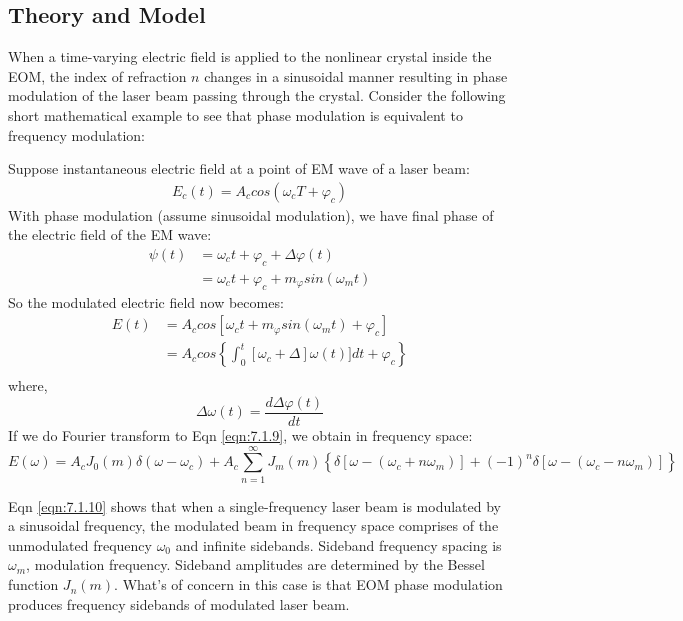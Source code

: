 \documentclass[12pt]{report}
\begin{document}
\subsection{Theory and Model}
When a time-varying electric field is applied to the nonlinear crystal inside the EOM, the index of refraction $n$ changes in a sinusoidal manner resulting in phase modulation of the laser beam passing through the crystal. Consider the following short mathematical example to see that phase modulation is equivalent to frequency modulation: 
\par
Suppose instantaneous electric field at a point of EM wave of a laser beam: 
\begin{align*}
    E_c(t) = A_c cos(\omega_c T + \varphi_c)
\end{align*}
With phase modulation (assume sinusoidal modulation), we have final phase of the electric field of the EM wave: 
\begin{align*}
    \psi(t) &= \omega_c t + \varphi_c + \Delta \varphi (t) \\
            &= \omega_c t + \varphi_c + m_{\varphi} sin(\omega_m t)
\end{align*}
So the modulated electric field now becomes: 
\begin{align}
    E(t) &= A_c cos[ \omega_c t + m_{\varphi} sin(\omega_m t) + \varphi_c] \label{eqn:7.1.9}\\
         &= A_c cos\left\{  \int_0^t [ \omega_c + \Delta ]\omega(t)] dt + \varphi_c \right\} \\
\end{align}
where, 
\begin{equation*}
    \Delta \omega (t) = \frac{d\Delta \varphi (t)}{dt}
\end{equation*}
If we do Fourier transform to Eqn \ref{eqn:7.1.9}, we obtain in frequency space: 
\begin{equation}
    E(\omega) = A_c J_0(m) \delta(\omega - \omega_c) + A_c\sum_{n=1}^\infty J_m(m) \left\{ \delta[\omega-(\omega_c + n\omega_m)] +(-1)^n\delta[\omega-(\omega_c-n\omega_m)]\right\}
    \label{eqn:7.1.10}
\end{equation}

Eqn \ref{eqn:7.1.10} shows that when a single-frequency laser beam is modulated by a sinusoidal frequency, the modulated beam in frequency space comprises of the unmodulated frequency $\omega_0$ and infinite sidebands. Sideband frequency spacing is $\omega_m$, modulation frequency. 
Sideband amplitudes are determined by the Bessel function $J_n(m)$. What's of concern in this case is that EOM phase modulation produces frequency sidebands of modulated laser beam. 
\end{document}
